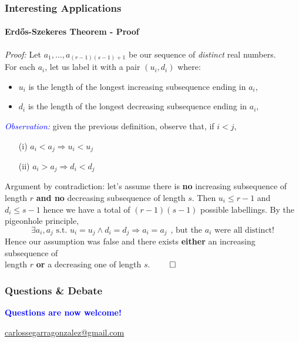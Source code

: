 \documentclass[9pt,    %
    english,            %
    xcolor=table,       %
    envcountsect,        %
    aspectratio=169     %
]{beamer}
\begin{document}
\begin{frame}
    \frametitle{Interesting Applications}
    \framesubtitle{Erd\H{o}s-Szekeres Theorem - Proof}

    \vspace{-10pt}

    \emph{Proof:}
    Let $a_1, \dots, a_{(r-1)(s-1) + 1}$ be our sequence of \emph{distinct} real numbers.\\
    For each $a_i$, let us label it with a pair $(u_i, d_i)$ where:
    \begin{itemize}
        \item $u_i$ is the length of the longest increasing subsequence ending in $a_i$,
        \item $d_i$ is the length of the longest decreasing subsequence ending in $a_i$,
    \end{itemize}
    \emph{\textcolor{blue}{Observation:}} given the previous definition, observe that, if $i < j$,
    \begin{itemize}
        \item[(i)] $a_i < a_j \Longrightarrow u_i < u_j$
        \item[(ii)] $a_i > a_j \Longrightarrow d_i < d_j$
    \end{itemize}
    Argument by contradiction: let's assume there is \textbf{no} increasing subsequence of length $r$ \textbf{and no} decreasing subsequence of length $s$.
    Then $u_i \leq r-1$ and $d_i \leq s-1$ hence we have a total of $(r-1)(s-1)$ possible labellings. By the pigeonhole principle,
    $$ \exists a_i, a_j \text{ s.t. } u_i = u_j \wedge d_i = d_j \Rightarrow a_i = a_j \hspace{5pt} \text{, but the $a_i$ were all distinct!}$$
    \hspace{20pt}Hence our assumption was false and there exists \textbf{either} an increasing subsequence of\\
    \hspace{40pt}length $r$ \textbf{or} a decreasing one of length $s$. \hfill $\qed$
\end{frame}

\begin{frame}
    \frametitle{Questions \& Debate}

    \begin{center}

        \Large
        \textbf{\textcolor{blue}{Questions are now welcome!}}

        \href{mailto:carlossegarragonzalez@gmail.com}{carlossegarragonzalez@gmail.com}

    \end{center}


\end{frame}
\end{document}
